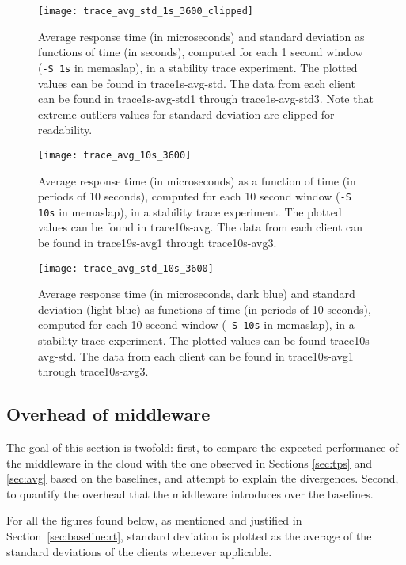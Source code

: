 \documentclass[11pt]{article}
\begin{document}
\begin{figure}[H]
	\centering
	\texttt{[image: trace\_avg\_std\_1s\_3600\_clipped]}
	\caption{Average response time (in microseconds) and standard deviation as functions of time (in seconds), computed for each 1 second window (\texttt{-S 1s} in memaslap), in a stability trace experiment. The plotted values can be found in trace1s-avg-std. The data from each client can be found in trace1s-avg-std1 through trace1s-avg-std3. Note that extreme outliers values for standard deviation are clipped for readability.}
	\label{trace:avg-std1}
\end{figure}

\begin{figure}[H]
	\centering
	\texttt{[image: trace\_avg\_10s\_3600]}
	\caption{Average response time (in microseconds) as a function of time (in periods of 10 seconds), computed for each 10 second window (\texttt{-S 10s} in memaslap), in a stability trace experiment. The plotted values can be found in trace10s-avg. The data from each client can be found in trace19s-avg1 through trace10s-avg3.}
	\label{trace:avg10}
\end{figure}

\begin{figure}[H]
	\centering
	\texttt{[image: trace\_avg\_std\_10s\_3600]}
	\caption{Average response time (in microseconds, dark blue) and standard deviation (light blue) as functions of time (in periods of 10 seconds), computed for each 10 second window (\texttt{-S 10s} in memaslap), in a stability trace experiment. The plotted values can be found trace10s-avg-std. The data from each client can be found in trace10s-avg1 through trace10s-avg3.}
	\label{trace:avg-std10}
\end{figure}

\subsection{Overhead of middleware}\label{sec:overhead}

The goal of this section is twofold: first, to compare the expected performance of the middleware in the cloud with the one observed in Sections \ref{sec:tps} and \ref{sec:avg} based on the baselines, and attempt to explain the divergences. Second, to quantify the overhead that the middleware introduces over the baselines.

For all the figures found below, as mentioned and justified in Section~\ref{sec:baseline:rt}, standard deviation is plotted as the average of the standard deviations of the clients whenever applicable.
\end{document}
